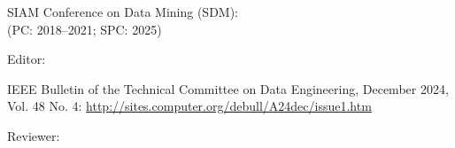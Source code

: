 \documentclass[10pt]{article}
\newenvironment{myindentpar}[1]%
{\begin{list}{}%
         {\setlength{\leftmargin}{#1}}%
         \item[]%
}
{\end{list}}
\newcounter{list}
\begin{document}
\begin{myindentpar}{0.75cm}
{SIAM Conference on Data Mining (SDM): \\
(PC: 2018--2021; SPC: 2025)



}


\hspace{-0.75cm}{\bf Journal Service}

Editor:

{\small

IEEE Bulletin of the Technical Committee on Data Engineering, December 2024, Vol. 48 No. 4: \url{http://sites.computer.org/debull/A24dec/issue1.htm}

}

Reviewer:

{\small

}
\end{myindentpar}
\end{document}
